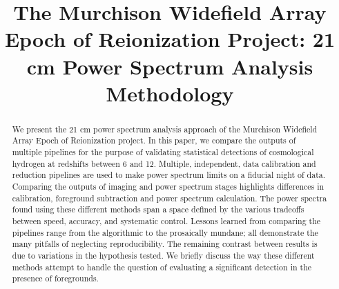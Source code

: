 \documentclass[twolcolumn]{emulateapj}
\begin{document}

\title{The Murchison Widefield Array Epoch of Reionization Project: 21 cm Power Spectrum Analysis Methodology}





\begin{abstract}
We present the 21 cm power spectrum analysis approach of the Murchison Widefield Array Epoch of Reionization project.  In this paper, we compare the outputs of multiple pipelines for the purpose of validating statistical detections of cosmological hydrogen at redshifts between 6 and 12. Multiple, independent, data calibration and reduction pipelines are used to make power spectrum limits on a fiducial night of data.  Comparing the outputs of imaging and power spectrum stages highlights differences in calibration, foreground subtraction and power spectrum calculation. The power spectra found using these different methods span a space defined by the various tradeoffs between speed, accuracy, and systematic control.  Lessons learned from comparing the pipelines range from the algorithmic to the prosaically mundane; all demonstrate the many pitfalls of neglecting reproducibility.  The remaining contrast between results is due to variations in the hypothesis tested. We briefly discuss the way these different methods attempt to handle the question of evaluating a significant detection in the presence of foregrounds.


\end{abstract}






\end{document}
